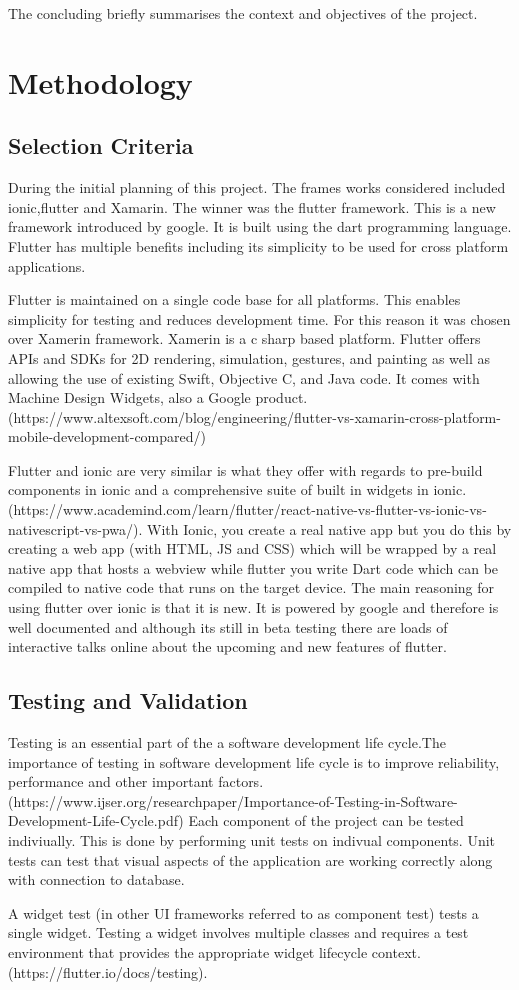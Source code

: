 The concluding briefly summarises the context and objectives of the project.

\chapter{Methodology}

\section{Selection Criteria}

During the initial planning of this project. The frames works considered included ionic,flutter and Xamarin. The winner was the flutter framework. This is a new framework introduced by google. It is built using the dart programming language. Flutter has multiple benefits including its simplicity to be used for cross platform applications.

Flutter is maintained on a single code base for all platforms. This enables simplicity for testing and reduces development time. For this reason it was chosen over Xamerin framework. Xamerin is a c sharp based platform. Flutter offers APIs and SDKs for 2D rendering, simulation, gestures, and painting as well as allowing the use of existing Swift, Objective C, and Java code. It comes with Machine Design Widgets, also a Google product. (https://www.altexsoft.com/blog/engineering/flutter-vs-xamarin-cross-platform-mobile-development-compared/)

Flutter and ionic are very similar is what they offer with regards to pre-build components in ionic and a comprehensive suite of built in widgets in ionic.(https://www.academind.com/learn/flutter/react-native-vs-flutter-vs-ionic-vs-nativescript-vs-pwa/). With Ionic, you create a real native app but you do this by creating a web app (with HTML, JS and CSS) which will be wrapped by a real native app that hosts a webview while flutter you write Dart code which can be compiled to native code that runs on the target device. The main reasoning for using flutter over ionic is that it is new. It is powered by google and therefore is well documented and although its still in beta testing there are loads of interactive talks online about the upcoming and new features of flutter. 

\section{Testing and Validation}
Testing is an essential part of the a software development life cycle.The importance of testing in software development life cycle is to improve reliability, performance and other important factors.(https://www.ijser.org/researchpaper/Importance-of-Testing-in-Software-
Development-Life-Cycle.pdf) Each component of the project can be tested indiviually. This is done by performing unit tests on indivual components. Unit tests can test that visual aspects of the application are working correctly along with connection to database.

A widget test (in other UI frameworks referred to as component test) tests a single widget. Testing a widget involves multiple classes and requires a test environment that provides the appropriate widget lifecycle context. (https://flutter.io/docs/testing).



 


